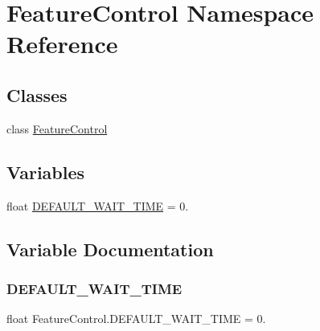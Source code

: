 \hypertarget{namespaceFeatureControl}{}\section{Feature\+Control Namespace Reference}
\label{namespaceFeatureControl}
\subsection*{Classes}
\begin{DoxyCompactItemize}
\item 
class \hyperlink{classFeatureControl_1_1FeatureControl}{Feature\+Control}
\end{DoxyCompactItemize}
\subsection*{Variables}
\begin{DoxyCompactItemize}
\item 
float \hyperlink{namespaceFeatureControl_aeebd4e13e6a3a0dde7d720af530ae36d}{D\+E\+F\+A\+U\+L\+T\+\_\+\+W\+A\+I\+T\+\_\+\+T\+I\+ME} = 0.
\end{DoxyCompactItemize}


\subsection{Variable Documentation}
\mbox{\label{namespaceFeatureControl_aeebd4e13e6a3a0dde7d720af530ae36d}} 
\subsubsection{\texorpdfstring{D\+E\+F\+A\+U\+L\+T\+\_\+\+W\+A\+I\+T\+\_\+\+T\+I\+ME}{DEFAULT\_WAIT\_TIME}}
{\footnotesize\ttfamily float Feature\+Control.\+D\+E\+F\+A\+U\+L\+T\+\_\+\+W\+A\+I\+T\+\_\+\+T\+I\+ME = 0.}

